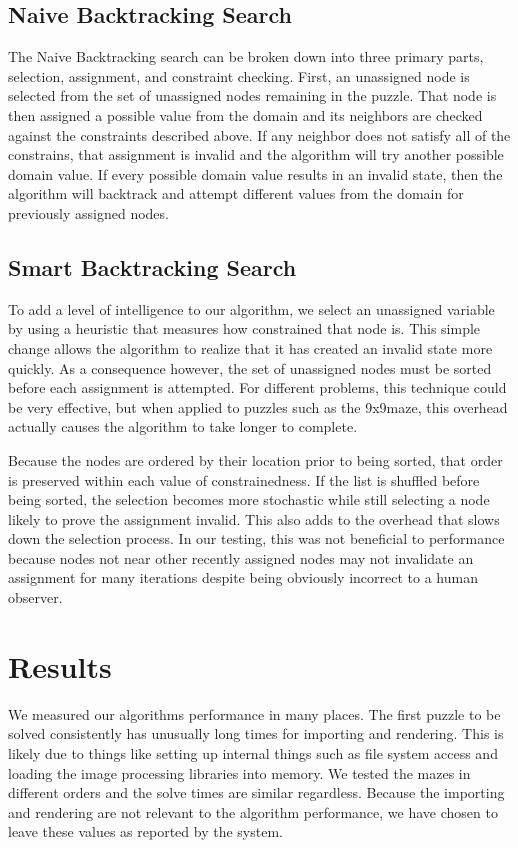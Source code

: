 \documentclass{article}
\begin{document}
\subsection{Naive Backtracking Search}
    The Naive Backtracking search can be broken down into three primary parts, selection, assignment, and constraint checking. First, an unassigned node is selected from the set of unassigned nodes remaining in the puzzle. That node is then assigned a possible value from the domain and its neighbors are checked against the constraints described above. If any neighbor does not satisfy all of the constrains, that assignment is invalid and the algorithm will try another possible domain value. If every possible domain value results in an invalid state, then the algorithm will backtrack and attempt different values from the domain for previously assigned nodes.
    

\subsection{Smart Backtracking Search}
    To add a level of intelligence to our algorithm, we select an unassigned variable by using a heuristic that measures how constrained that node is. This simple change allows the algorithm to realize that it has created an invalid state more quickly. As a consequence however, the set of unassigned nodes must be sorted before each assignment is attempted. For different problems, this technique could be very effective, but when applied to puzzles such as the 9x9maze, this overhead actually causes the algorithm to take longer to complete.
    
    Because the nodes are ordered by their location prior to being sorted, that order is preserved within each value of constrainedness. If the list is shuffled before being sorted, the selection becomes more stochastic while still selecting a node likely to prove the assignment invalid. This also adds to the overhead that slows down the selection process. In our testing, this was not beneficial to performance because nodes not near other recently assigned nodes may not invalidate an assignment for many iterations despite being obviously incorrect to a human observer.

    
\section{Results}
    We measured our algorithms performance in many places. The first puzzle to be solved consistently has unusually long times for importing and rendering. This is likely due to things like setting up internal things such as file system access and loading the image processing libraries into memory. We tested the mazes in different orders and the solve times are similar regardless. Because the importing and rendering are not relevant to the algorithm performance, we have chosen to leave these values as reported by the system.
    
\end{document}
